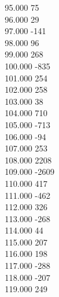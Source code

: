 { 95.000	75 \\
 96.000	29 \\
 97.000	-141 \\
 98.000	96 \\
 99.000	268 \\
 100.000	-835 \\
 101.000	254 \\
 102.000	258 \\
 103.000	38 \\
 104.000	710 \\
 105.000	-713 \\
 106.000	-94 \\
 107.000	253 \\
 108.000	2208 \\
 109.000	-2609 \\
 110.000	417 \\
 111.000	-462 \\
 112.000	326 \\
 113.000	-268 \\
 114.000	44 \\
 115.000	207 \\
 116.000	198 \\
 117.000	-288 \\
 118.000	-207 \\
 119.000	249 \\
}
